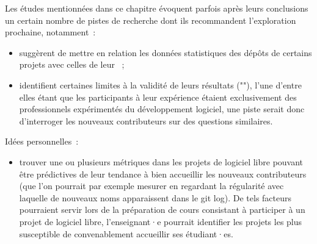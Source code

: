 Les études mentionnées dans ce chapitre évoquent parfois après leurs conclusions un certain nombre de pistes
de recherche dont ils recommandent l'exploration prochaine, notamment :

\begin{itemize}
    \item \textcite[p.~14]{contribution-patterns-2010} suggèrent de mettre en relation les données
        statistiques des \glspl{dépôt} de certains projets avec celles de leur  ;
    \item \textcite[p.~1013]{barriers-2018} identifient certaines limites à la validité de leurs résultats
        (""), l'une d'entre elles étant que les participants à leur expérience
         étaient exclusivement des professionnels expérimentés du développement logiciel, une
        piste serait donc d'interroger les nouveaux contributeurs sur des questions similaires.
\end{itemize}

Idées personnelles :

\begin{itemize}
    \item trouver une ou plusieurs métriques dans les projets de logiciel libre pouvant être prédictives de
        leur tendance à bien accueillir les nouveaux contributeurs (que l'on pourrait par exemple mesurer en
        regardant la régularité avec laquelle de nouveaux noms apparaissent dans le git log). De tels facteurs
        pourraient servir lors de la préparation de cours consistant à participer à un projet de logiciel
        libre, l'enseignant·e pourrait identifier les projets les plus susceptible de convenablement
        accueillir ses étudiant·es.
\end{itemize}
